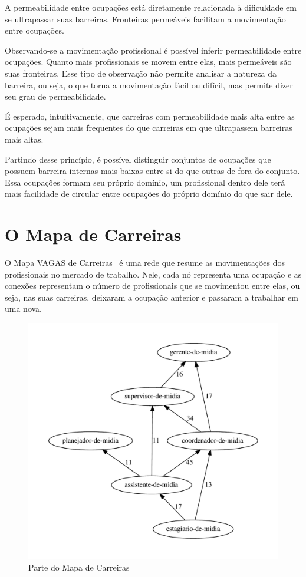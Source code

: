 \documentclass[
  article,
  11pt,
  a4paper,
  english,
  brazil,
  sumario=tradicional]{abntex2}
\begin{document}
A permeabilidade entre ocupações está diretamente relacionada à dificuldade em se ultrapassar suas barreiras. Fronteiras permeáveis facilitam a movimentação entre ocupações.

Observando-se a movimentação profissional é possível inferir permeabilidade entre ocupações. Quanto mais profissionais se movem entre elas, mais permeáveis são suas fronteiras. Esse tipo de observação não permite analisar a natureza da barreira, ou seja, o que torna a movimentação fácil ou difícil, mas permite dizer seu grau de permeabilidade.

É esperado, intuitivamente, que carreiras com permeabilidade mais alta entre as ocupações sejam mais frequentes do que carreiras em que ultrapassem barreiras mais altas.

Partindo desse princípio, é possível distinguir conjuntos de ocupações que possuem barreira internas mais baixas entre si do que outras de fora do conjunto. Essa ocupações formam seu próprio domínio, um profissional dentro dele terá mais facilidade de circular entre ocupações do próprio domínio do que sair dele.

\section{O Mapa de Carreiras} \label{sec:mapa}

O Mapa VAGAS de Carreiras~\cite{VAGAS_Tecnologia2015-yv} é uma rede que resume as movimentações dos profissionais no mercado de trabalho. Nele, cada nó representa uma ocupação e as conexões representam o número de profissionais que se movimentou entre elas, ou seja, nas suas carreiras, deixaram a ocupação anterior e passaram a trabalhar em uma nova.

\begin{figure}[ht]
  \centering
  \includegraphics[scale=0.6]{cluster_23.pdf}
  \caption{Parte do Mapa de Carreiras}
  \label{fig:ex-mapa-midia}
\end{figure}
\end{document}
